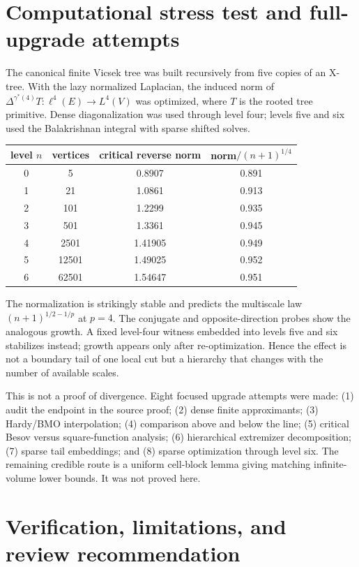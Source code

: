 \documentclass[11pt]{article}
\theoremstyle{remark}
\begin{document}
\section{Computational stress test and full-upgrade attempts}

The canonical finite Vicsek tree was built recursively from five copies of an
X-tree.  With the lazy normalized Laplacian, the induced norm of
$\Delta^{\gamma^*(4)}T:\ell^4(E)\to L^4(V)$ was optimized, where $T$ is the
rooted tree primitive.  Dense diagonalization was used through level four;
levels five and six used the Balakrishnan integral with sparse shifted solves.

\begin{center}
\begin{tabular}{@{}cccc@{}}
\toprule
level $n$ & vertices & critical reverse norm & norm$/ (n+1)^{1/4}$\\
\midrule
0 & 5     & 0.8907 & 0.891\\
1 & 21    & 1.0861 & 0.913\\
2 & 101   & 1.2299 & 0.935\\
3 & 501   & 1.3361 & 0.945\\
4 & 2501  & 1.41905& 0.949\\
5 & 12501 & 1.49025& 0.952\\
6 & 62501 & 1.54647& 0.951\\
\bottomrule
\end{tabular}
\end{center}

The normalization is strikingly stable and predicts the multiscale law
$(n+1)^{1/2-1/p}$ at $p=4$.  The conjugate and opposite-direction probes show
the analogous growth.  A fixed level-four witness embedded into levels five
and six stabilizes instead; growth appears only after re-optimization.  Hence
the effect is not a boundary tail of one local cut but a hierarchy that changes
with the number of available scales.

This is not a proof of divergence.  Eight focused upgrade attempts were made:
(1) audit the endpoint in the source proof; (2) dense finite approximants;
(3) Hardy/BMO interpolation; (4) comparison above and below the line;
(5) critical Besov versus square-function analysis; (6) hierarchical
extremizer decomposition; (7) sparse tail embeddings; and (8) sparse
optimization through level six.  The remaining credible route is a uniform
cell-block lemma giving matching infinite-volume lower bounds.  It was not
proved here.

\section{Verification, limitations, and review recommendation}
\end{document}
